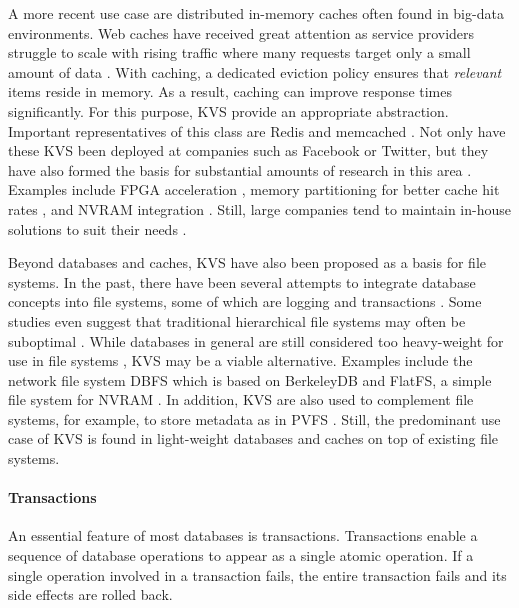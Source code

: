 A more recent use case are distributed in-memory caches often found in big-data
environments. Web caches have received great attention as service providers
struggle to scale with rising traffic where many requests target only a small
amount of data \cite{xu2014characterizing}. With caching, a dedicated eviction
policy ensures that \emph{relevant} items reside in memory. As a result, caching
can improve response times significantly. For this purpose, KVS provide an
appropriate abstraction. Important representatives of this class are Redis
\cite{redis2017home} and memcached \cite{memcached2017home}. Not only have these
KVS been deployed at companies such as Facebook or Twitter, but they have also
formed the basis for substantial amounts of research in this area
\cite{xu2014characterizing}. Examples include FPGA acceleration
\cite{lavasani2014fpga}, memory partitioning for better cache hit rates
\cite{carra2014memory}, and NVRAM integration \cite{wu2016nvmcached,
malinowski2017using, venkataraman2011consistent}. Still, large companies tend to
maintain in-house solutions to suit their needs \cite{chang2008bigtable,
decandia2007dynamo, lakshman2010cassandra, wang2015hydradb}.

Beyond databases and caches, KVS have also been proposed as a basis for file
systems. In the past, there have been several attempts to integrate database
concepts into file systems, some of which are logging \cite{rosenblum1992design,
tweedie1998journaling} and transactions \cite{seltzer1990transaction,
wright2007extending, spillane2009enabling}. Some studies even suggest that
traditional hierarchical file systems may often be suboptimal
\cite{stein2005stupid, seltzer2009hierarchical}. While databases in general are
still considered too heavy-weight for use in file systems
\cite{seltzer2009hierarchical}, KVS may be a viable alternative. Examples
include the network file system DBFS which is based on BerkeleyDB
\cite{murphy2002design} and FlatFS, a simple file system for NVRAM
\cite{volos2014aerie}. In addition, KVS are also used to complement file
systems, for example, to store metadata as in PVFS \cite{carns2009small}. Still,
the predominant use case of KVS is found in light-weight databases and caches on
top of existing file systems.

\paragraph{Transactions}

An essential feature of most databases is transactions. Transactions enable a
sequence of database operations to appear as a single atomic operation. If a
single operation involved in a transaction fails, the entire transaction fails and its side effects are rolled back.

